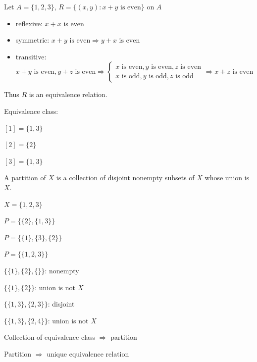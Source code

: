 \documentclass{blog}
\begin{document}
\begin{example}
    Let $A = \{1,2,3\}$, $R = \{(x,y) : x + y \text{ is even}\}$ on $A$

    \begin{itemize}
        \item reflexive: $x+x$ is even
        \item symmetric: $x+y \text{ is even} \Rightarrow y+x \text{ is even}$
        \item transitive: $x+y \text{ is even}, y+z \text{ is even} \Rightarrow \begin{cases}
                      x \text{ is even}, y \text{ is even}, z \text{ is even} \\
                      x \text{ is odd}, y \text{ is odd}, z \text{ is odd}
                  \end{cases} \Rightarrow x+z \text{ is even}$
    \end{itemize}

    Thus $R$ is an equivalence relation.

    Equivalence class:

    $[1] = \{1,3\}$

    $[2] = \{2\}$

    $[3] = \{1,3\}$
\end{example}

\begin{definition}
    A partition of $X$ is a collection of disjoint nonempty subsets of $X$ whose union is $X$.
\end{definition}

\begin{example}
    $X = \{1,2,3\}$

    $P = \{\{2\},\{1,3\}\}$

    $P = \{\{1\},\{3\},\{2\}\}$

    $P = \{\{1,2,3\}\}$

    $\{\{1\},\{2\},\{\}\}$: nonempty

    $\{\{1\},\{2\}\}$: union is not $X$

    $\{\{1,3\},\{2,3\}\}$: disjoint

    $\{\{1,3\},\{2,4\}\}$: union is not $X$
\end{example}

\begin{example}
    Collection of equivalence class $\Rightarrow$ partition

    Partition $\Rightarrow$ unique equivalence relation
\end{example}
\end{document}
